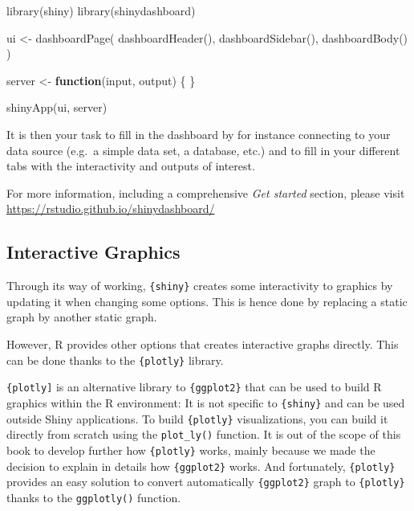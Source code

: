 \documentclass[
]{krantz}
\makeatletter
\newenvironment{Shaded}{\begin{snugshade}}{\end{snugshade}}
\newcommand{\ControlFlowTok}[1]{\textcolor[rgb]{0.27,0.27,0.27}{\textbf{#1}}}
\newcommand{\FunctionTok}[1]{\textcolor[rgb]{0,0,0}{#1}}
\newcommand{\NormalTok}[1]{#1}
\newcommand{\OtherTok}[1]{\textcolor[rgb]{0.37,0.37,0.37}{#1}}
\newenvironment{kframe}{%
\medskip{}
\setlength{\fboxsep}{.8em}
 \def\at@end@of@kframe{}%
 \ifinner\ifhmode%
  \def\at@end@of@kframe{\end{minipage}}%
  \begin{minipage}{\columnwidth}%
 \fi\fi%
 \def\FrameCommand##1{\hskip\@totalleftmargin \hskip-\fboxsep
 \colorbox{shadecolor}{##1}\hskip-\fboxsep
     \hskip-\linewidth \hskip-\@totalleftmargin \hskip\columnwidth}%
 \MakeFramed {\advance\hsize-\width
   \@totalleftmargin\z@ \linewidth\hsize
   \@setminipage}}%
 {\par\unskip\endMakeFramed%
 \at@end@of@kframe}
\renewenvironment{Shaded}{\begin{kframe}}{\end{kframe}}
\makeatother
\begin{document}
\begin{Shaded}
\begin{Highlighting}[]
\FunctionTok{library}\NormalTok{(shiny)}
\FunctionTok{library}\NormalTok{(shinydashboard)}

\NormalTok{ui }\OtherTok{\textless{}{-}} \FunctionTok{dashboardPage}\NormalTok{(}
  \FunctionTok{dashboardHeader}\NormalTok{(),}
  \FunctionTok{dashboardSidebar}\NormalTok{(),}
  \FunctionTok{dashboardBody}\NormalTok{()}
\NormalTok{)}

\NormalTok{server }\OtherTok{\textless{}{-}} \ControlFlowTok{function}\NormalTok{(input, output) \{ \}}

\FunctionTok{shinyApp}\NormalTok{(ui, server)}
\end{Highlighting}
\end{Shaded}

It is then your task to fill in the dashboard by for instance connecting to your data source (e.g.~a simple data set, a database, etc.) and to fill in your different tabs with the interactivity and outputs of interest.

For more information, including a comprehensive \emph{Get started} section, please visit \url{https://rstudio.github.io/shinydashboard/}

\hypertarget{interactive-graphics}{%
\subsection{Interactive Graphics}\label{interactive-graphics}}

Through its way of working, \texttt{\{shiny\}} creates some interactivity to graphics by updating it when changing some options. This is hence done by replacing a static graph by another static graph.

However, R provides other options that creates interactive graphs directly. This can be done thanks to the \texttt{\{plotly\}} library.

\texttt{\{plotly{]}} is an alternative library to \texttt{\{ggplot2\}} that can be used to build R graphics within the R environment: It is not specific to \texttt{\{shiny\}} and can be used outside Shiny applications. To build \texttt{\{plotly\}} visualizations, you can build it directly from scratch using the \texttt{plot\_ly()} function. It is out of the scope of this book to develop further how \texttt{\{plotly\}} works, mainly because we made the decision to explain in details how \texttt{\{ggplot2\}} works. And fortunately, \texttt{\{plotly\}} provides an easy solution to convert automatically \texttt{\{ggplot2\}} graph to \texttt{\{plotly\}} thanks to the \texttt{ggplotly()} function.
\end{document}
